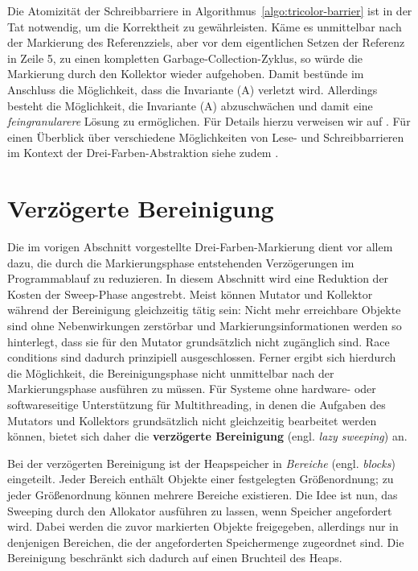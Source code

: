Die Atomizität der Schreibbarriere  in Algorithmus~\ref{algo:tricolor-barrier} ist in der Tat notwendig, um die Korrektheit zu gewährleisten.
Käme es unmittelbar nach der Markierung des Referenzziels, aber vor dem eigentlichen Setzen der Referenz in Zeile 5, zu einen kompletten Garbage-Collection-Zyklus, so würde die Markierung durch den Kollektor wieder aufgehoben.
Damit bestünde im Anschluss die Möglichkeit, dass die Invariante (A) verletzt wird.
Allerdings besteht die Möglichkeit, die Invariante (A) abzuschwächen und damit eine \textit{feingranularere} Lösung zu ermöglichen.
Für Details hierzu verweisen wir auf \cite[S. 972ff]{dijkstra1978}.
Für einen Überblick über verschiedene Möglichkeiten von Lese- und Schreibbarrieren im Kontext der Drei-Farben-Abstraktion siehe zudem \cite{pirinen}.


\section{Verzögerte Bereinigung}
\label{sec:lazy-sweep}
Die im vorigen Abschnitt vorgestellte Drei-Farben-Markierung dient vor allem dazu, die durch die Markierungsphase entstehenden Verzögerungen im Programmablauf zu reduzieren.
In diesem Abschnitt wird eine Reduktion der Kosten der Sweep-Phase angestrebt.
Meist können Mutator und Kollektor während der Bereinigung gleichzeitig tätig sein:
Nicht mehr erreichbare Objekte sind ohne Nebenwirkungen zerstörbar und Markierungsinformationen werden so hinterlegt, dass sie für den Mutator grundsätzlich nicht zugänglich sind.
Race conditions sind dadurch prinzipiell ausgeschlossen.
Ferner ergibt sich hierdurch die Möglichkeit, die Bereinigungsphase nicht unmittelbar nach der Markierungsphase ausführen zu müssen.
Für Systeme ohne hardware- oder softwareseitige Unterstützung für Multithreading, in denen die Aufgaben des Mutators und Kollektors grundsätzlich nicht gleichzeitig bearbeitet werden können, bietet sich daher die \textbf{verzögerte Bereinigung} (engl. \textit{lazy sweeping}) an.

Bei der verzögerten Bereinigung ist der Heapspeicher in \textit{Bereiche} (engl. \textit{blocks}) eingeteilt.
Jeder Bereich enthält Objekte einer festgelegten Größenordnung; zu jeder Größenordnung können mehrere Bereiche existieren.
Die Idee ist nun, das Sweeping durch den Allokator ausführen zu lassen, wenn Speicher angefordert wird.
Dabei werden die zuvor markierten Objekte freigegeben, allerdings nur in denjenigen Bereichen, die der angeforderten Speichermenge zugeordnet sind.
Die Bereinigung beschränkt sich dadurch auf einen Bruchteil des Heaps.

